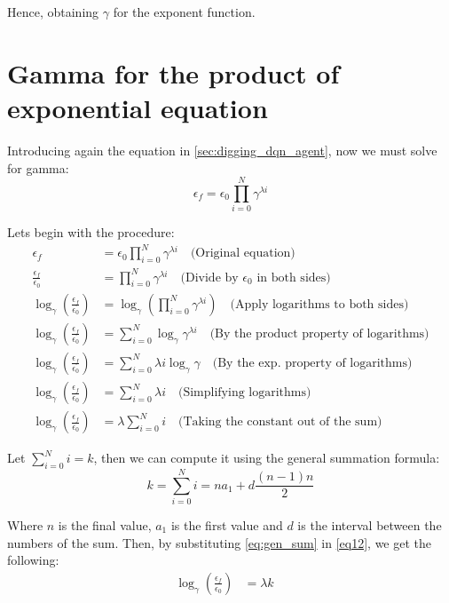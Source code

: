 Hence, obtaining $\gamma$ for the exponent function.

\section{Gamma for the product of exponential equation}
Introducing again the equation in \ref{sec:digging_dqn_agent}, now we must solve for gamma: 
\begin{equation}
	\epsilon_f = \epsilon_0 \prod_{i=0}^{N} \gamma^{\lambda i}
\end{equation}

\noindent Lets begin with the procedure:
\begin{align}
	\epsilon_f &= \epsilon_0 \prod_{i=0}^{N} \gamma^{\lambda i} \quad \text{(Original equation)} \label{eq4} \\
	\frac{\epsilon_f}{\epsilon_0} &= \prod_{i=0}^{N} \gamma^{\lambda i} \quad \text{(Divide by $\epsilon_0$ in both sides)} \label{eq6} \\
	\log_\gamma \left(\frac{\epsilon_f}{\epsilon_0}\right) &= \log_\gamma \left( \prod_{i=0}^{N} \gamma^{\lambda i} \right) \quad \text{(Apply logarithms to both sides)} \label{eq7} \\
	\log_\gamma \left(\frac{\epsilon_f}{\epsilon_0}\right) &= \sum_{i=0}^{N} \log_\gamma  \gamma^{\lambda i} \quad \text{(By the product property of logarithms)} \label{eq9} \\
	\log_\gamma \left(\frac{\epsilon_f}{\epsilon_0}\right) &= \sum_{i=0}^{N} \lambda i \log_\gamma \gamma \quad \text{(By the exp. property of logarithms)} \label{eq10} \\
	\log_\gamma \left(\frac{\epsilon_f}{\epsilon_0}\right) &= \sum_{i=0}^{N} \lambda i \quad \text{(Simplifying logarithms)} \label{eq11} \\
	\log_\gamma \left(\frac{\epsilon_f}{\epsilon_0}\right) &= \lambda \sum_{i=0}^{N} i \quad \text{(Taking the constant out of the sum)} \label{eq12} 
\end{align}

Let $\sum_{i=0}^{N} i = k$, then we can compute it using the general summation formula:
\begin{equation}
	\label{eq:gen_sum}
	k = \sum_{i=0}^{N} i  = n a_1 + d \frac{(n-1)n}{2}
\end{equation}

Where $n$ is the final value, $a_1$ is the first value and $d$ is the interval between the numbers of the sum. Then, by substituting \ref{eq:gen_sum} in \ref{eq12}, we get the following:
\begin{align}
	\log_\gamma \left(\frac{\epsilon_f}{\epsilon_0}\right) &= \lambda k \quad \label{eq13}
\end{align}

